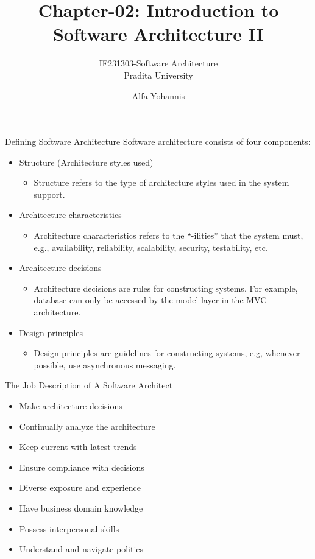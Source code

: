 \documentclass{beamer}
\title{Chapter-02: Introduction to Software Architecture II}
\subtitle{IF231303-Software Architecture\\Pradita University}
\author{Alfa Yohannis}
\begin{document}
\begin{frame}[plain]
    \maketitle
\end{frame}

\begin{frame}{Defining Software Architecture}
Software architecture consists of four components:
\begin{itemize}

\item Structure (Architecture styles used)
\begin{itemize}
\item Structure refers to the type of architecture styles used in the system support.
\end{itemize}

\item Architecture characteristics 
\begin{itemize}
\item Architecture characteristics refers to the ``-ilities'' that the system must, e.g., availability, reliability, scalability, security, testability, etc. 
\end{itemize}

\item Architecture decisions
\begin{itemize}
\item Architecture decisions are rules for constructing systems. For example, database can only be accessed by the model layer in the MVC architecture.
\end{itemize}

\item Design principles
\begin{itemize}
\item Design principles are guidelines for constructing systems, e.g, whenever possible, use asynchronous messaging.
\end{itemize}

\end{itemize}
\end{frame}

\begin{frame}{The Job Description of A Software Architect}
\begin{itemize}
\item Make architecture decisions
\item Continually analyze the architecture
\item Keep current with latest trends
\item Ensure compliance with decisions
\item Diverse exposure and experience
\item Have business domain knowledge
\item Possess interpersonal skills
\item Understand and navigate politics
\end{itemize}
\end{frame}
\end{document}
